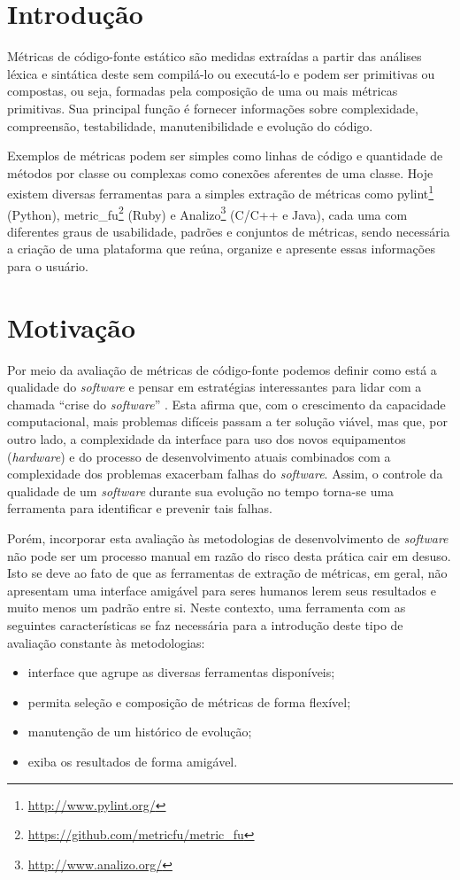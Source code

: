 \documentclass{llncs}
\begin{document}
\section{Introdução} \label{sec:intro}
Métricas de código-fonte estático são medidas extraídas a partir das análises léxica e sintática deste sem compilá-lo ou executá-lo e podem ser primitivas ou compostas, ou seja, formadas pela composição de uma ou mais métricas primitivas. Sua principal função é fornecer informações sobre complexidade, compreensão, testabilidade, manutenibilidade e evolução do código\cite{meirelles2013monitoramento}.

Exemplos de métricas podem ser simples como linhas de código e quantidade de métodos por classe ou complexas como conexões aferentes de uma classe.
Hoje existem diversas ferramentas para a simples extração de métricas como  pylint\footnote{\url{http://www.pylint.org/}} (Python), metric\_fu\footnote{\url{https://github.com/metricfu/metric_fu}} (Ruby) e Analizo\footnote{\url{http://www.analizo.org/}} (C/C++ e Java), cada uma com diferentes graus de usabilidade, padrões e conjuntos de métricas, sendo necessária a criação de uma plataforma que reúna, organize e apresente essas informações para o usuário.

\section{Motivação}\label{sec:motivacao}
Por meio da avaliação de métricas de código-fonte podemos definir como está a qualidade do \textit{software} e pensar em estratégias interessantes para lidar com a chamada ``crise do \textit{software}'' \cite{naur1969software}. Esta afirma que, com o crescimento da capacidade computacional, mais problemas difíceis passam a ter solução viável, mas que, por outro lado, a complexidade da interface para uso dos novos equipamentos (\textit{hardware}) e do processo de desenvolvimento atuais combinados com a complexidade dos problemas exacerbam falhas do \textit{software}. Assim, o controle da qualidade de um \textit{software} durante sua evolução no tempo torna-se uma ferramenta para identificar e prevenir tais falhas.

Porém, incorporar esta avaliação às metodologias de desenvolvimento de \textit{software} não pode ser um processo manual em razão do risco desta prática cair em desuso. Isto se deve ao fato de que as ferramentas de extração de métricas, em geral, não apresentam uma interface amigável para seres humanos lerem seus resultados e muito menos um padrão entre si.
Neste contexto, uma ferramenta com as seguintes características se faz necessária para a introdução deste tipo de avaliação constante às metodologias:
\begin{itemize}
  \item interface que agrupe as diversas ferramentas disponíveis;
  \item permita seleção e composição de métricas de forma flexível;
  \item manutenção de um histórico de evolução;
  \item exiba os resultados de forma amigável.
\end{itemize}
\end{document}
